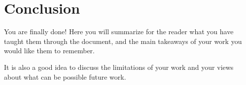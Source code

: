 \chapter{Conclusion}
\label{ch:conclusion}

You are finally done! Here you will summarize for the reader what you have taught them through the document, and the main takeaways of your work you would like them to remember.

It is also a good idea to discuss the limitations of your work and your views about what can be
possible future work.